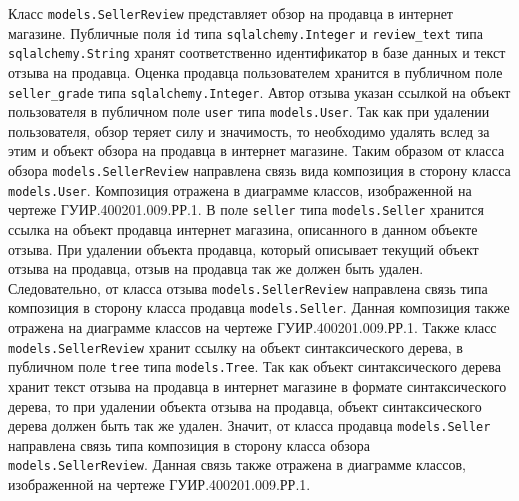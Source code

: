 Класс \texttt{models.SellerReview} представляет обзор на продавца в интернет магазине. Публичные поля \texttt{id} типа \texttt{sqlalchemy.Integer} и \texttt{review\_text} типа \texttt{sqlalchemy.String} хранят соответственно идентификатор в базе данных и текст отзыва на продавца. Оценка продавца пользователем хранится в публичном поле \texttt{seller\_grade} типа \texttt{sqlalchemy.Integer}. Автор отзыва указан ссылкой на объект пользователя в публичном поле \texttt{user} типа \texttt{models.User}. Так как при удалении пользователя, обзор теряет силу и значимость, то необходимо удалять вслед за этим и объект обзора на продавца в интернет магазине. Таким образом от класса обзора \texttt{models.SellerReview} направлена связь вида композиция в сторону класса \texttt{models.User}. Композиция отражена в диаграмме классов, изображенной на чертеже ГУИР.400201.009.РР.1. В поле \texttt{seller} типа \texttt{models.Seller} хранится ссылка на объект продавца интернет магазина, описанного в данном объекте отзыва. При удалении объекта продавца, который описывает текущий объект отзыва на продавца, отзыв на продавца так же должен быть удален. Следовательно, от класса отзыва \texttt{models.SellerReview} направлена связь типа композиция в сторону класса продавца \texttt{models.Seller}. Данная композиция также отражена на диаграмме классов на чертеже ГУИР.400201.009.РР.1. Также класс \texttt{models.SellerRevi\-ew} хранит ссылку на объект синтаксического дерева, в публичном поле \texttt{tree} типа \texttt{models.Tree}. Так как объект синтаксического дерева хранит текст отзыва на продавца в интернет магазине в формате синтаксического дерева, то при удалении объекта отзыва на продавца, объект синтаксического дерева должен быть так же удален. Значит, от класса продавца \texttt{models.Seller} направлена связь типа композиция в сторону класса обзора \texttt{models.SellerReview}. Данная связь также отражена в диаграмме классов, изображенной на чертеже ГУИР.400201.009.РР.1.

